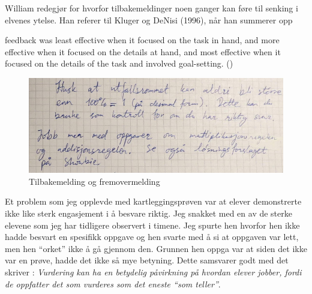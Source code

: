 \documentclass[main.tex]{subfiles}
\begin{document}
William redegjør for hvorfor tilbakemeldinger noen ganger kan føre til senking 
i elvenes ytelse. Han referer til Kluger og DeNisi (1996), når han summerer opp 
\begin{displayquote}
\textelp{} feedback was least effective when it focused on the task in hand, 
and more effective when it focused on the details at hand, and most effective 
when it focused on the details of the task and involved goal-setting.
()
\end{displayquote}

\begin{figure}
\centering
\includegraphics[scale = 0.4]{../figures/mohsin2.png}
\caption{Tilbakemelding og fremovermelding}
\label{fig:mohsin2}
\end{figure}

Et problem som jeg opplevde med kartleggingsprøven var at elever demonstrerte ikke like sterk engasjement
i å besvare riktig. Jeg snakket med en av de sterke elevene som jeg har tidligere observert i timene.
Jeg spurte hen hvorfor hen ikke hadde besvart en spesifikk oppgave og hen svarte med å si at oppgaven 
var lett, men hen ``orket'' ikke å gå gjennom den. Grunnen hen oppga var at siden det ikke var en prøve,
hadde det ikke så mye betyning. Dette samsvarer godt med det  skriver : \emph{Vurdering 
kan ha en betydelig påvirkning på hvordan elever jobber, fordi de oppfatter det som vurderes som det eneste
``som teller''}.
\end{document}
